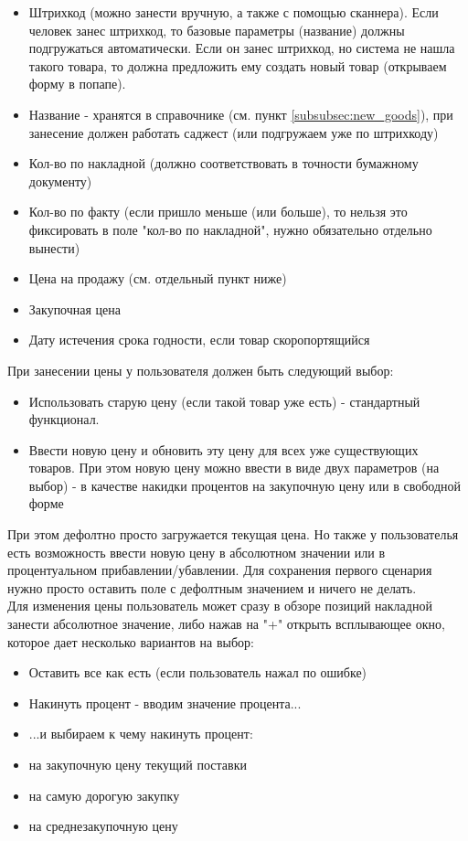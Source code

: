 \documentclass[DIV=calc, paper=a4, fontsize=11pt]{scrartcl} %
\begin{document}
\begin{itemize}
	\item Штрихкод (можно занести вручную, а также с помощью сканнера). Если человек занес штрихкод, то базовые параметры (название) должны подгружаться автоматически. Если он занес штрихкод, но система не нашла такого товара, то должна предложить ему создать новый товар (открываем форму в попапе).
	\item Название - хранятся в справочнике (см. пункт \ref{subsubsec:new_goods}), при занесение должен работать саджест (или подгружаем уже по штрихкоду)
	\item Кол-во по накладной (должно соответствовать в точности бумажному документу)
	\item Кол-во по факту (если пришло меньше (или больше), то нельзя это фиксировать в поле "кол-во по накладной", нужно обязательно отдельно вынести)
	\item Цена на продажу (см. отдельный пункт ниже)
	\item Закупочная цена
	\item Дату истечения срока годности, если товар скоропортящийся
\end{itemize}
При занесении цены у пользователя должен быть следующий выбор:
\begin{itemize}
	\item Использовать старую цену (если такой товар уже есть) - стандартный функционал.
	\item Ввести новую цену и обновить эту цену для всех уже существующих товаров. При этом новую цену можно ввести в виде двух параметров (на выбор) - в качестве накидки процентов на закупочную цену или в свободной форме 
\end{itemize}
При этом дефолтно просто загружается текущая цена. Но также у пользователья есть возможность ввести новую цену в абсолютном значении или в процентуальном прибавлении/убавлении. Для сохранения первого сценария нужно просто оставить поле с дефолтным значением и ничего не делать. 
\\[0.5cm]
Для изменения цены пользователь может сразу в обзоре позиций накладной занести абсолютное значение, либо нажав на "+" открыть всплывающее окно, которое дает несколько вариантов на выбор:

\begin{itemize}
	\item Оставить все как есть (если пользователь нажал по ошибке)
	\item Накинуть процент - вводим значение процента...
	\item ...и выбираем к чему накинуть процент:
	\item на закупочную цену текущий поставки
	\item на самую дорогую закупку
	\item на среднезакупочную цену
\end{itemize}
\end{document}
